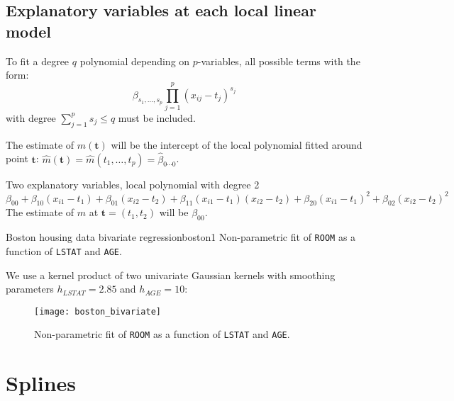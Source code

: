 \subsection{Explanatory variables at each local linear model}

To fit a degree $q$ polynomial depending on $p$-variables, all possible terms with the form:
\begin{equation*}
    \beta_{s_1, \ldots, s_p} \prod_{j=1}^p \left(
        x_{ij} - t_j
    \right)^{s_j}
\end{equation*}
with degree $\sum_{j=1}^p s_j \leq q$ must be included.

The estimate of $m(\boldsymbol t)$ will be the intercept of the local polynomial
fitted around point $\boldsymbol t$: $\hat m(\boldsymbol t) = \hat m(t_1, \ldots, t_p) = \hat \beta_{0\cdots 0}$.

\begin{example}{Two explanatory variables, local polynomial with degree 2}{}
    \begin{equation*}
        \beta_{00} + \beta_{10} (x_{i1} - t_1)
        + \beta_{01} (x_{i2} - t_2)
        + \beta_{11} (x_{i1} - t_1)(x_{i2} - t_2)
        + \beta_{20} (x_{i1} - t_1)^2
        + \beta_{02} (x_{i2} - t_2)^2
    \end{equation*}
    \tcblower
    The estimate of $m$ at $\boldsymbol t = (t_1, t_2)$ will be $\beta_{00}$.
\end{example}

\begin{example}{Boston housing data bivariate regression}{boston1}
    Non-parametric fit of \texttt{ROOM} as a function of \texttt{LSTAT}
    and \texttt{AGE}.

    We use a kernel product of two univariate Gaussian kernels with
    smoothing parameters $h_{LSTAT} = 2.85$ and $h_{AGE} = 10$:

    \begin{figure}[H]
        \texttt{[image: boston\_bivariate]}
        \caption{Non-parametric fit of \texttt{ROOM} as a function of \texttt{LSTAT} and \texttt{AGE}.}
    \end{figure}
\end{example}

\pagebreak
\section{Splines}

